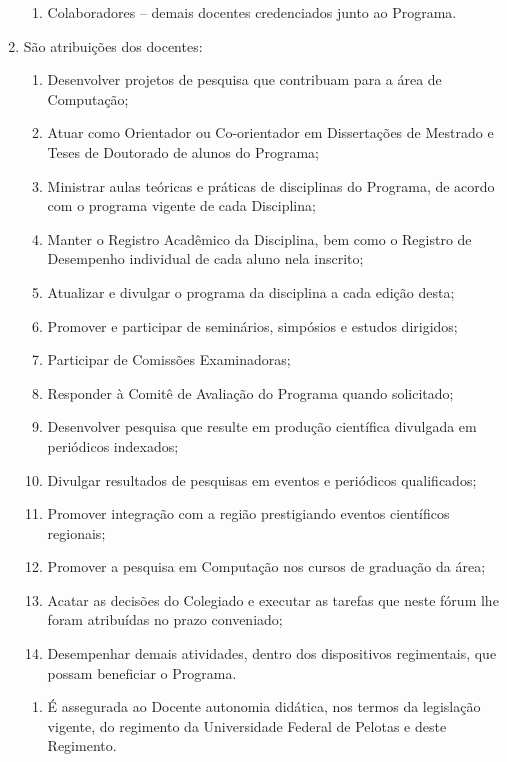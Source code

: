 \documentclass{article}
\newcommand{\singleitem}{\item[Parágrafo Único.]}
\begin{document}
\begin{enumerate}
\begin{enumerate}[label=\Roman*]
		\item Colaboradores – demais docentes credenciados junto ao Programa.

	\end{enumerate}

	\item São atribuições dos docentes:
	\begin{enumerate}[label=\Roman*]
		\item 	Desenvolver projetos de pesquisa que contribuam para a área de Computação;
		\item	Atuar como Orientador ou Co-orientador em Dissertações de Mestrado e Teses de Doutorado de alunos do Programa;
		\item	Ministrar aulas teóricas e práticas de disciplinas do Programa, de acordo com o programa vigente de cada Disciplina;
		\item	Manter o Registro Acadêmico da Disciplina, bem como o Registro de Desempenho individual de cada aluno nela inscrito;
		\item	Atualizar e divulgar o programa da disciplina a cada edição desta;
		\item	Promover e participar de seminários, simpósios e estudos dirigidos;
		\item	Participar de Comissões Examinadoras;
		\item	Responder à Comitê de Avaliação do Programa quando solicitado;
		\item	Desenvolver pesquisa que resulte em produção científica divulgada em periódicos indexados;
		\item	Divulgar resultados de pesquisas em eventos e periódicos qualificados;
		\item	Promover integração com a região prestigiando eventos científicos regionais;
		\item	Promover a pesquisa em Computação nos cursos de graduação da área;
		\item	Acatar as decisões do Colegiado e executar as tarefas que neste fórum lhe foram atribuídas no prazo conveniado;
		\item	Desempenhar demais atividades, dentro dos dispositivos regimentais, que possam beneficiar o Programa.
	\end{enumerate}

	\begin{enumerate}
		\singleitem É assegurada ao Docente autonomia didática, nos termos da legislação vigente, do regimento da Universidade Federal de Pelotas e deste Regimento.
	\end{enumerate}
\end{enumerate}
\end{document}
